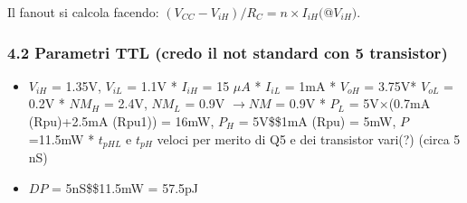 \documentclass[
]{article}
\providecommand{\tightlist}{%
  \setlength{\itemsep}{0pt}\setlength{\parskip}{0pt}}
\begin{document}
Il fanout si calcola facendo:
\((V_{CC}-V_{iH})/R_{C}=n\times I_{iH}(\)@\(V_{iH})\).

\subsubsection{4.2 Parametri TTL (credo il not standard con 5
transistor)}\label{parametri-ttl-credo-il-not-standard-con-5-transistor}

\begin{itemize}
\tightlist
\item
  \(V_{iH}\) = 1.35V, \(V_{iL}\) = 1.1V * \(I_{iH}\) = 15 \(\mu A\) *
  \(I_{iL}\) = 1mA * \(V_{oH}\) = 3.75V* \(V_{oL}\) = 0.2V * \(NM_{H}\)
  = 2.4V, \(NM_{L}\) = 0.9V \(\to NM\) = 0.9V * \(P_{L}\) =
  5V\(\times\)(0.7mA (Rpu)+2.5mA (Rpu1)) = 16mW, \(P_{H}\) =
  5V\$\times\$1mA (Rpu) = 5mW, \(P\) =11.5mW * \(t_{pHL}\) e \(t_{pH}\)
  veloci per merito di Q5 e dei transistor vari(?) (circa 5 nS)
\item
  \(DP\) = 5nS\$\times\$11.5mW = 57.5pJ
\end{itemize}
\end{document}
